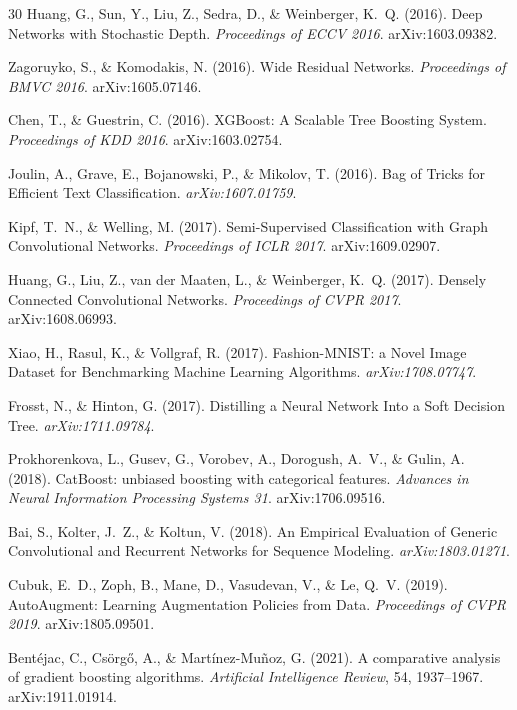 \documentclass[11pt]{article}
\begin{document}
\begin{thebibliography}{30}
Huang, G., Sun, Y., Liu, Z., Sedra, D., \& Weinberger, K.~Q. (2016).
Deep Networks with Stochastic Depth.
\textit{Proceedings of ECCV 2016}. arXiv:1603.09382.

Zagoruyko, S., \& Komodakis, N. (2016).
Wide Residual Networks.
\textit{Proceedings of BMVC 2016}. arXiv:1605.07146.

Chen, T., \& Guestrin, C. (2016).
XGBoost: A Scalable Tree Boosting System.
\textit{Proceedings of KDD 2016}. arXiv:1603.02754.

Joulin, A., Grave, E., Bojanowski, P., \& Mikolov, T. (2016).
Bag of Tricks for Efficient Text Classification. \textit{arXiv:1607.01759}.

Kipf, T.~N., \& Welling, M. (2017).
Semi-Supervised Classification with Graph Convolutional Networks.
\textit{Proceedings of ICLR 2017}. arXiv:1609.02907.

Huang, G., Liu, Z., van der Maaten, L., \& Weinberger, K.~Q. (2017).
Densely Connected Convolutional Networks.
\textit{Proceedings of CVPR 2017}. arXiv:1608.06993.

Xiao, H., Rasul, K., \& Vollgraf, R. (2017).
Fashion-MNIST: a Novel Image Dataset for Benchmarking Machine Learning Algorithms.
\textit{arXiv:1708.07747}.

Frosst, N., \& Hinton, G. (2017).
Distilling a Neural Network Into a Soft Decision Tree. \textit{arXiv:1711.09784}.

Prokhorenkova, L., Gusev, G., Vorobev, A., Dorogush, A.~V., \& Gulin, A. (2018).
CatBoost: unbiased boosting with categorical features.
\textit{Advances in Neural Information Processing Systems 31}. arXiv:1706.09516.

Bai, S., Kolter, J.~Z., \& Koltun, V. (2018).
An Empirical Evaluation of Generic Convolutional and Recurrent Networks for Sequence Modeling.
\textit{arXiv:1803.01271}.

Cubuk, E.~D., Zoph, B., Mane, D., Vasudevan, V., \& Le, Q.~V. (2019).
AutoAugment: Learning Augmentation Policies from Data.
\textit{Proceedings of CVPR 2019}. arXiv:1805.09501.

Bentéjac, C., Csörgő, A., \& Martínez-Muñoz, G. (2021).
A comparative analysis of gradient boosting algorithms.
\textit{Artificial Intelligence Review}, 54, 1937--1967. arXiv:1911.01914.


\end{thebibliography}
\end{document}
